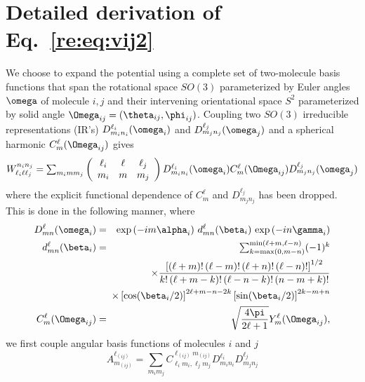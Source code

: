\documentclass[preprint]{iucr}              %
\newcommand{\mb}[1]{\ensuremath{\mbox{\boldmath $ #1 $}}}
\begin{document}
\pagebreak

\appendix

\section{Detailed derivation of Eq.~\ref{re:eq:vij2}}
\label{derivation}

We choose to expand the potential using a complete set of
two-molecule basis functions that span the rotational space
$SO(3)$ parameterized by Euler angles $\mb{\omega}$ of molecule
$i,j$ and their intervening orientational space $S^2$
parameterized by solid angle
$\mb{\Omega}_{ij}=(\theta_{ij},\phi_{ij})$. Coupling two $SO(3)$
irreducible representations (IR's)
$D^{\ell_i}_{m_{i}n_{i}}(\mb{\omega}_i)$ and
$D^{\ell_j}_{m_{j}n_{j}}(\mb{\omega}_j)$ and a spherical harmonic
$C^\ell_m(\mb{\Omega}_{ij})$ gives
\begin{equation}
\label{Wbasis}W^{n_i n_j}_{\ell_i \ell \ell_j}=\sum_{m_imm_j}
\left(\begin{array}{ccc} \ell_i & \ell & \ell_j \\
m_i & m & m_j
\end{array}\right)D^{\ell_i}_{m_in_i}(\mb{\omega}_i)C^\ell_m(\mb{\Omega}_{ij})
D^{\ell_j}_{m_jn_j}(\mb{\omega}_j)
\end{equation}
where the explicit functional dependence of $C^\ell_m$ and
$D^{\ell_j}_{m_jn_j}$ has been dropped. This is done in the following manner,
where \cite{Varshalovich88}
\begin{eqnarray}
D_{mn}^{\ell}(\mb{\omega}_i)&=&\exp \left(-i m \alpha_i \right)
\, d_{mn}^{\ell}(\beta_i) \, \exp \left(-i n \gamma_i \right)\\
d_{mn}^{\ell}(\beta_i)&=&\sum_{k = \max(0,m-n )}^{\min( \ell+m,
\ell-n)} (-1)^k\nonumber\\
&&\!\!\!\!\!\!\!\!\!\!\!\!\times\frac{\left[(\ell+m)!\,(\ell-m)!\,(\ell+n)!\,
(\ell-n)!
\right]^{1/2}}{k!\,(\ell+m-k)!\,(\ell-n-k)!
\,(n-m+k)!}\nonumber \\
&&\!\!\!\!\!\!\!\!\!\!\!\!\times\left[\cos(\beta_i/2)\right]^{2\ell+m-n-2k}
 \left[\sin(\beta_i/2)\right]^{2k-m+n}\\
C_{m}^{\ell}(\mb{\Omega}_{ij})&=&\sqrt{\frac{4\pi}{2\ell+1}}Y_{m}^{\ell}(\mb{
\Omega}_{ij}),
\end{eqnarray}
we first couple angular basis functions of molecules $i$ and $j$
\begin{equation}
\label{angAB} A^{\ell_{(ij)}}_{m_{(ij)}}=
\sum_{m_im_j}C_{\ell_{i}m_{i},\ell_{j}m_j}^{\ell_{(ij)}m_{(ij)}}D^{\ell_i}_{
m_in_i}D^{\ell_j}_{m_jn_j}
\end{equation}
\end{document}
